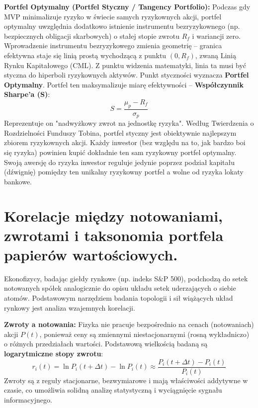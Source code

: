 \documentclass[11pt, a4paper]{article}
\begin{document}
\textbf{Portfel Optymalny (Portfel Styczny / Tangency Portfolio):}
Podczas gdy MVP minimalizuje ryzyko w świecie samych ryzykownych akcji, portfel optymalny uwzględnia dodatkowo istnienie instrumentu bezryzykownego (np. bezpiecznych obligacji skarbowych) o stałej stopie zwrotu $R_f$ i wariancji zero.
Wprowadzenie instrumentu bezryzykowego zmienia geometrię – granica efektywna staje się linią prostą wychodzącą z punktu $(0, R_f)$, zwaną Linią Rynku Kapitałowego (CML). Z punktu widzenia matematyki, linia ta musi być styczna do hiperboli ryzykownych aktywów. Punkt styczności wyznacza \textbf{Portfel Optymalny}.
Portfel ten maksymalizuje miarę efektywności – \textbf{Współczynnik Sharpe'a (S)}:
\[
S = \frac{\mu_p - R_f}{\sigma_p}
\]
Reprezentuje on "nadwyżkowy zwrot na jednostkę ryzyka". Według Twierdzenia o Rozdzielności Funduszy Tobina, portfel styczny jest obiektywnie najlepszym zbiorem ryzykownych akcji. Każdy inwestor (bez względu na to, jak bardzo boi się ryzyka) powinien kupić dokładnie ten sam ryzykowny portfel optymalny. Swoją awersję do ryzyka inwestor reguluje jedynie poprzez podział kapitału (dźwignię) pomiędzy ten unikalny ryzykowny portfel a wolne od ryzyka lokaty bankowe.

\section{Korelacje między notowaniami, zwrotami i taksonomia portfela papierów wartościowych.}

Ekonofizycy, badając giełdy rynkowe (np. indeks S\&P 500), podchodzą do setek notowanych spółek analogicznie do opisu układu setek uderzających o siebie atomów. Podstawowym narzędziem badania topologii i sił wiążących układ rynkowy jest analiza wzajemnych korelacji.

\textbf{Zwroty a notowania:}
Fizyka nie pracuje bezpośrednio na cenach (notowaniach) akcji $P(t)$, ponieważ ceny są zmiennymi niestacjonarnymi (rosną wykładniczo) o różnych przedziałach wartości. Podstawową wielkością badaną są \textbf{logarytmiczne stopy zwrotu}:
\[
r_i(t) = \ln P_i(t+\Delta t) - \ln P_i(t) \approx \frac{P_i(t+\Delta t) - P_i(t)}{P_i(t)}
\]
Zwroty są z reguły stacjonarne, bezwymiarowe i mają właściwości addytywne w czasie, co umożliwia solidną analizę statystyczną i wyciągnięcie sygnału informacyjnego.
\end{document}
